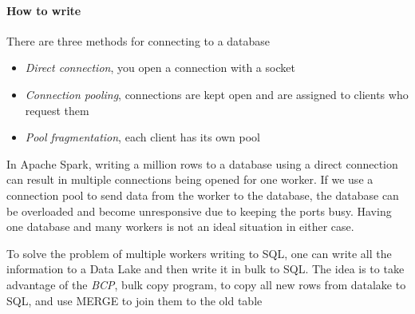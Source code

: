\paragraph{How to write}
There are three methods for connecting to a database
\begin{itemize}
    \item \textit{Direct connection}, you open a connection with a socket
    \item \textit{Connection pooling}, connections are kept open and are assigned to clients who request them
    \item \textit{Pool fragmentation}, each client has its own pool
\end{itemize}
In Apache Spark, writing a million rows to a database using a direct connection can result in multiple connections being opened for one worker. If we use a connection pool to send data from the worker to the database, the database can be overloaded and become unresponsive due to keeping the ports busy. Having one database and many workers is not an ideal situation in either case.

To solve the problem of multiple workers writing to SQL, one can write all the information to a Data Lake and then write it in bulk to SQL. The idea is to take advantage of the \textit{BCP}, bulk copy program, to copy all new rows from datalake to SQL, and use MERGE to join them to the old table

\newpage